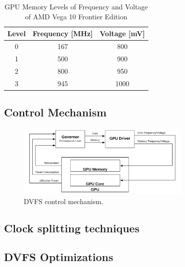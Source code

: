 \begin{table}[!htb]
\renewcommand{\arraystretch}{1.2} %
\centering
\begin{tabular}{ccc}
\textbf{Level} & \textbf{Frequency {[}MHz{]}} & \textbf{Voltage {[}mV{]}} \\ \hline
0              & 167                          & 800                       \\
1              & 500                          & 900                       \\
2              & 800                          & 950                       \\
3              & 945                          & 1000                      \\ \hline
\end{tabular}
\caption{GPU Memory Levels of Frequency and Voltage of AMD Vega 10 Frontier Edition}
\label{tab:gpumemlevels}
\end{table}




\subsection{Control Mechanism}

\begin{figure}[!htb]
  \centering
  \includegraphics[width=0.75\textwidth]{Figures/StateArt/DVFS.png}
  \caption[Controller]{DVFS control mechanism.}
  \label{fig:DVFSmechanism}
\end{figure}




\subsection{Clock splitting techniques}

\subsection{DVFS Optimizations}

